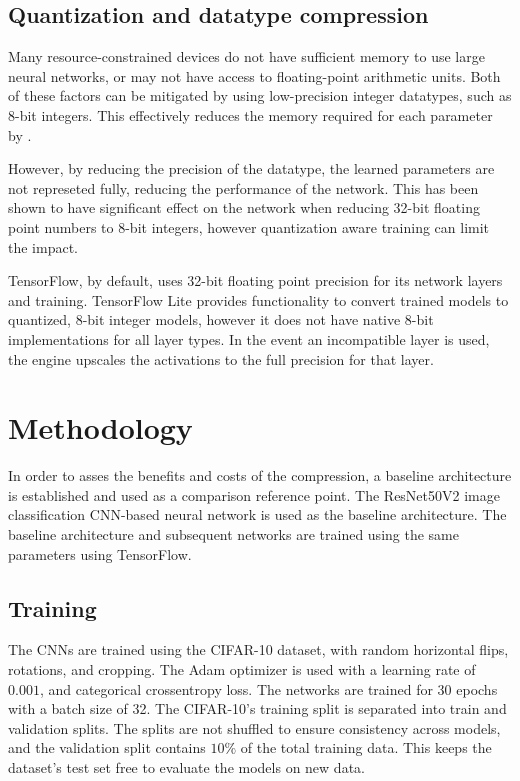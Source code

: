 \documentclass{article}
\begin{document}
	\subsection{Quantization and datatype compression}
	
	Many resource-constrained devices do not have sufficient memory to use large neural networks, or may not have access to floating-point arithmetic units. Both of these factors can be mitigated by using low-precision integer datatypes, such as 8-bit integers. This effectively reduces the memory required for each parameter by . 
	
	However, by reducing the precision of the datatype, the learned parameters are not represeted fully, reducing the performance of the network. This has been shown to have significant effect on the network when reducing 32-bit floating point numbers to 8-bit integers, however quantization aware training can limit the impact. 
	
	TensorFlow, by default, uses 32-bit floating point precision for its network layers and training. TensorFlow Lite provides functionality to convert trained models to quantized, 8-bit integer models, however it does not have native 8-bit implementations for all layer types. In the event an incompatible layer is used, the engine upscales the activations to the full precision for that layer.
	
	\section{Methodology}
	In order to asses the benefits and costs of the compression, a baseline architecture is established and used as a comparison reference point. The ResNet50V2 image classification CNN-based neural network is used as the baseline architecture. The baseline architecture and subsequent networks are trained using the same parameters using TensorFlow. 
	
	\subsection{Training}
	
	The CNNs are trained using the CIFAR-10 dataset, with random horizontal flips, rotations, and cropping. The Adam optimizer is used with a learning rate of $0.001$, and categorical crossentropy loss. The networks are trained for 30 epochs with a batch size of 32. The CIFAR-10's training split is separated into train and validation splits. The splits are not shuffled to ensure consistency across models, and the validation split contains $10\%$ of the total training data. This keeps the dataset's test set free to evaluate the models on new data.
	
\end{document}

